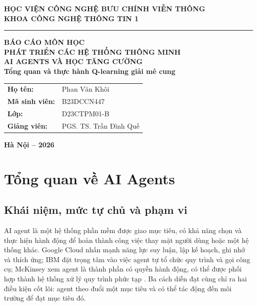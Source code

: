 \documentclass[12pt,a4paper]{report}
\begin{document}
\hypersetup{pageanchor=false}
\begin{titlepage}
\thispagestyle{empty}
\begin{center}
\vspace*{0.7cm}
{\bfseries\fontsize{16}{20}\selectfont HỌC VIỆN CÔNG NGHỆ BƯU CHÍNH VIỄN THÔNG}\\[0.15cm]
{\bfseries\fontsize{15}{19}\selectfont KHOA CÔNG NGHỆ THÔNG TIN 1}\\[0.3cm]
\rule{5cm}{0.5pt}
\vspace{2.2cm}

{\bfseries\fontsize{18}{24}\selectfont BÁO CÁO MÔN HỌC}\\[0.35cm]
{\bfseries\fontsize{17}{23}\selectfont PHÁT TRIỂN CÁC HỆ THỐNG THÔNG MINH}\\[0.7cm]
{\bfseries\color{reportblue}\fontsize{22}{28}\selectfont AI AGENTS VÀ HỌC TĂNG CƯỜNG}\\[0.3cm]
{\bfseries\fontsize{16}{21}\selectfont Tổng quan và thực hành Q-learning giải mê cung}

\vspace{2.0cm}
\begin{tabular}{>{\bfseries}p{4.1cm}p{6.5cm}}
Họ tên: & Phan Văn Khôi \\
Mã sinh viên: & B23DCCN447 \\
Lớp: & D23CTPM01-B \\
Giảng viên: & PGS. TS. Trần Đình Quế \\
\end{tabular}
\vfill
{\bfseries\fontsize{14}{18}\selectfont Hà Nội -- 2026}
\end{center}
\end{titlepage}
\hypersetup{pageanchor=true}
\tableofcontents
\clearpage
{}

\chapter{Tổng quan về AI Agents}
\label{chap:agents}

\section{Khái niệm, mức tự chủ và phạm vi}
AI agent là một hệ thống phần mềm được giao mục tiêu, có khả năng chọn và thực hiện
hành động để hoàn thành công việc thay mặt người dùng hoặc một hệ thống khác. Google
Cloud nhấn mạnh năng lực suy luận, lập kế hoạch, ghi nhớ và thích ứng; IBM đặt trọng tâm
vào việc agent tự tổ chức quy trình và gọi công cụ; McKinsey xem agent là thành phần có
quyền hành động, có thể được phối hợp thành hệ thống xử lý quy trình phức tạp
\cite{google,ibm,mckinsey}. Ba cách diễn đạt cùng chỉ ra hai điều kiện cốt lõi: agent theo
đuổi một mục tiêu và có thể tác động đến môi trường để đạt mục tiêu đó.
\end{document}
